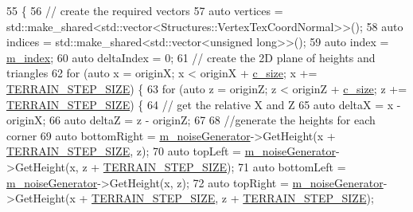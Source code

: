\begin{DoxyCode}
55 \{
56     \textcolor{comment}{// create the required vectors}
57     \textcolor{keyword}{auto} vertices = std::make\_shared<std::vector<Structures::VertexTexCoordNormal>>();
58     \textcolor{keyword}{auto} indices = std::make\_shared<std::vector<unsigned long>>();
59     \textcolor{keyword}{auto} index = \mbox{\hyperlink{class_terrain_generation_helper_a225a9ea3488c08d2565efee5461c4d00}{m\_index}};
60     \textcolor{keyword}{auto} deltaIndex = 0;
61     \textcolor{comment}{// create the 2D plane of heights and triangles}
62     \textcolor{keywordflow}{for} (\textcolor{keyword}{auto} x = originX; x < originX + \mbox{\hyperlink{class_terrain_generation_helper_a2e182f64a684cc0cf248f2f940cc36dc}{c\_size}}; x += \mbox{\hyperlink{_terrain_generation_helper_8h_ad04a251ab3e1323474688977de1579e4}{TERRAIN\_STEP\_SIZE}}) \{
63         \textcolor{keywordflow}{for} (\textcolor{keyword}{auto} z = originZ; z < originZ + \mbox{\hyperlink{class_terrain_generation_helper_a2e182f64a684cc0cf248f2f940cc36dc}{c\_size}}; z += 
      \mbox{\hyperlink{_terrain_generation_helper_8h_ad04a251ab3e1323474688977de1579e4}{TERRAIN\_STEP\_SIZE}}) \{
64             \textcolor{comment}{// get the relative X and Z}
65             \textcolor{keyword}{auto} deltaX = x - originX;
66             \textcolor{keyword}{auto} deltaZ = z - originZ;
67 
68             \textcolor{comment}{//generate the heights for each corner}
69             \textcolor{keyword}{auto} bottomRight = \mbox{\hyperlink{class_terrain_generation_helper_a2c9870bfe0dbf1a87a864562f28adc20}{m\_noiseGenerator}}->GetHeight(x + 
      \mbox{\hyperlink{_terrain_generation_helper_8h_ad04a251ab3e1323474688977de1579e4}{TERRAIN\_STEP\_SIZE}}, z);
70             \textcolor{keyword}{auto} topLeft = \mbox{\hyperlink{class_terrain_generation_helper_a2c9870bfe0dbf1a87a864562f28adc20}{m\_noiseGenerator}}->GetHeight(x, z + 
      \mbox{\hyperlink{_terrain_generation_helper_8h_ad04a251ab3e1323474688977de1579e4}{TERRAIN\_STEP\_SIZE}});
71             \textcolor{keyword}{auto} bottomLeft = \mbox{\hyperlink{class_terrain_generation_helper_a2c9870bfe0dbf1a87a864562f28adc20}{m\_noiseGenerator}}->GetHeight(x, z);
72             \textcolor{keyword}{auto} topRight = \mbox{\hyperlink{class_terrain_generation_helper_a2c9870bfe0dbf1a87a864562f28adc20}{m\_noiseGenerator}}->GetHeight(x + 
      \mbox{\hyperlink{_terrain_generation_helper_8h_ad04a251ab3e1323474688977de1579e4}{TERRAIN\_STEP\_SIZE}}, z + \mbox{\hyperlink{_terrain_generation_helper_8h_ad04a251ab3e1323474688977de1579e4}{TERRAIN\_STEP\_SIZE}});

\end{DoxyCode}
